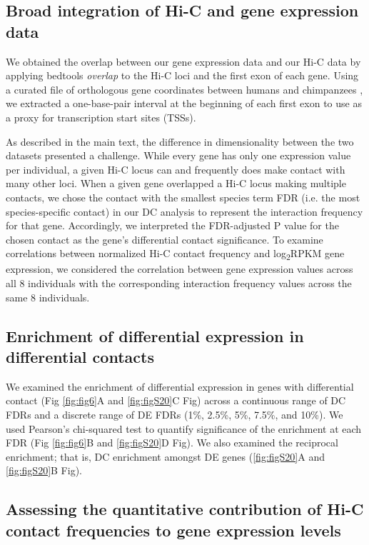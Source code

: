 \subsection{Broad integration of Hi-C and gene expression data}

We obtained the overlap between our gene expression data and our Hi-C data by applying bedtools \textit{overlap} \cite{Quinlan.2010} to the Hi-C loci and the first exon of each gene. Using a curated file of orthologous gene coordinates between humans and chimpanzees \cite{Pavlovic.2018}, we extracted a one-base-pair interval at the beginning of each first exon to use as a proxy for transcription start sites (TSSs).

As described in the main text, the difference in dimensionality between the two datasets presented a challenge. While every gene has only one expression value per individual, a given Hi-C locus can and frequently does make contact with many other loci. When a given gene overlapped a Hi-C locus making multiple contacts, we chose the contact with the smallest species term FDR (i.e. the most species-specific contact) in our DC analysis to represent the interaction frequency for that gene. Accordingly, we interpreted the FDR-adjusted P value for the chosen contact as the gene's differential contact significance. To examine correlations between normalized Hi-C contact frequency and log\textsubscript{2}RPKM gene expression, we considered the correlation between gene expression values across all 8 individuals with the corresponding interaction frequency values across the same 8 individuals.

\subsection{Enrichment of differential expression in differential contacts}

We examined the enrichment of differential expression in genes with differential contact (Fig \ref{fig:fig6}A and \ref{fig:figS20}C Fig) across a continuous range of DC FDRs and a discrete range of DE FDRs (1\%, 2.5\%, 5\%, 7.5\%, and 10\%). We used Pearson's chi-squared test to quantify significance of the enrichment at each FDR (Fig \ref{fig:fig6}B and \ref{fig:figS20}D Fig). We also examined the reciprocal enrichment; that is, DC enrichment amongst DE genes (\ref{fig:figS20}A and \ref{fig:figS20}B Fig).

\subsection{Assessing the quantitative contribution of Hi-C contact frequencies to gene expression levels}

